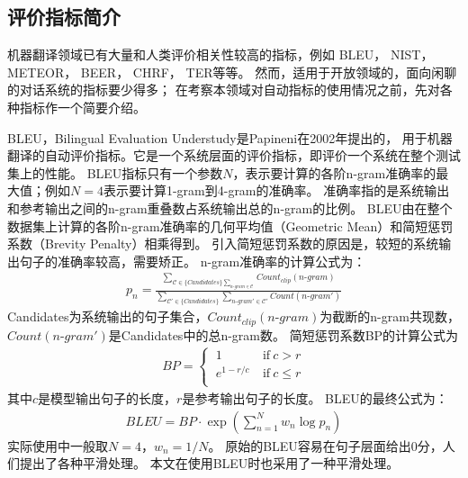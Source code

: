 \subsection{评价指标简介}\label{subsec:metrics_intro}
机器翻译领域已有大量和人类评价相关性较高的指标，例如
BLEU，
NIST，
METEOR，
BEER，
CHRF，
TER等等。
然而，适用于开放领域的，面向闲聊的对话系统的指标要少得多；
在考察本领域对自动指标的使用情况之前，先对各种指标作一个简要介绍。

BLEU，Bilingual Evaluation Understudy是Papineni在2002年提出的，
用于机器翻译的自动评价指标。它是一个系统层面的评价指标，即评价一个系统在整个测试集上的性能。
BLEU指标只有一个参数$N$，表示要计算的各阶n-gram准确率的最大值；例如$N = 4$表示要计算1-gram到4-gram的准确率。
准确率指的是系统输出和参考输出之间的n-gram重叠数占系统输出总的n-gram的比例。
BLEU由在整个数据集上计算的各阶n-gram准确率的几何平均值（Geometric Mean）和简短惩罚系数（Brevity Penalty）相乘得到。
引入简短惩罚系数的原因是，较短的系统输出句子的准确率较高，需要矫正。
n-gram准确率的计算公式为：
\begin{align}
    p_n = \frac{
    \sum_{\mathcal{C} \in \{\textit{Candidates}\}
    \sum_{\textit{n-gram} \in \mathcal{C}}}
    \textit{Count}_{\textit{clip}}(\textit{n-gram})
    }{
    \sum_{\mathcal{C'} \in \{\textit{Candidates}\}}
    \sum_{\textit{n-gram}' \in \mathcal{C'}}
    \textit{Count}(\textit{n-gram}')
    }
\end{align}
Candidates为系统输出的句子集合，$\textit{Count}_{\textit{clip}}(\textit{n-gram})$为截断的n-gram共现数，
$\textit{Count}(\textit{n-gram}')$是Candidates中的总n-gram数。
简短惩罚系数BP的计算公式为
\begin{align}
    \textit{BP} =
    \begin{cases}
        \ 1 \ & \text{if} \  c > r \\
        \ e^{1 - r/c} \ & \text{if} \  c \leq r \\
    \end{cases}
\end{align}
其中$c$是模型输出句子的长度，$r$是参考输出句子的长度。
BLEU的最终公式为：
\begin{align}
    \textit{BLEU} = \textit{BP} \cdot \exp \left( \sum_{n=1}^N w_n \log p_n \right)
\end{align}
实际使用中一般取$N = 4$，$w_n = 1 / N$。
原始的BLEU容易在句子层面给出0分，人们提出了各种平滑处理。
本文在使用BLEU时也采用了一种平滑处理。


